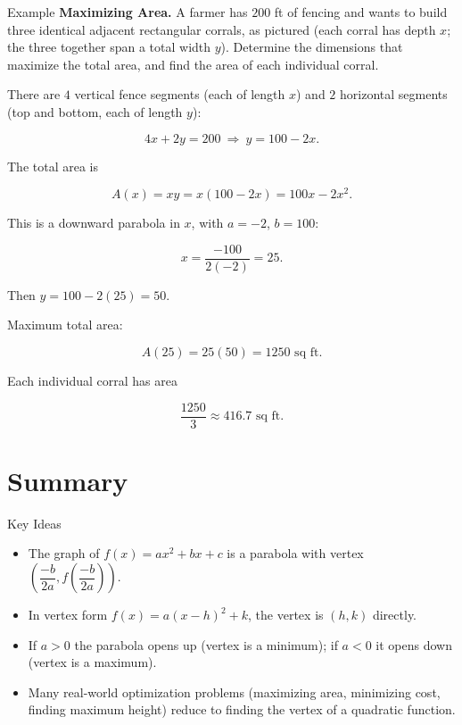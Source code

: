 \documentclass[12pt]{article}
\newcounter{examplenum}
\newenvironment{friendlyex}{%
    \refstepcounter{examplenum}%
    \begin{friendlyexbox}{Example \theexamplenum}%
}{%
    \end{friendlyexbox}%
}
\begin{document}
  

\begin{friendlyex}{}
\textbf{Maximizing Area.} A farmer has $200$ ft of fencing and wants to build three identical adjacent rectangular corrals, as pictured (each corral has depth $x$; the three together span a total width $y$). Determine the dimensions that maximize the total area, and find the area of each individual corral.
\end{friendlyex}

\begin{center}
\end{center}

 

\begin{solutionbox}
There are $4$ vertical fence segments (each of length $x$) and $2$ horizontal segments (top and bottom, each of length $y$):

\[
4x+2y=200\ \Longrightarrow\ y=100-2x.
\]

The total area is

\[
A(x)=xy=x(100-2x)=100x-2x^2.
\]

This is a downward parabola in $x$, with $a=-2$, $b=100$:

\[
x=\frac{-100}{2(-2)}=25.
\]

Then $y=100-2(25)=50$.

Maximum total area:

\[
A(25)=25(50)=1250\text{ sq ft.}
\]

Each individual corral has area

\[
\frac{1250}{3}\approx 416.7\text{ sq ft.}
\]
\end{solutionbox}

  

\section*{Summary}

\begin{friendlyrule}{Key Ideas}
\begin{itemize}
    \item The graph of $f(x)=ax^2+bx+c$ is a parabola with vertex $\left(\dfrac{-b}{2a}, f\left(\dfrac{-b}{2a}\right)\right)$.
    \item In vertex form $f(x)=a(x-h)^2+k$, the vertex is $(h,k)$ directly.
    \item If $a>0$ the parabola opens up (vertex is a minimum); if $a<0$ it opens down (vertex is a maximum).
    \item Many real-world optimization problems (maximizing area, minimizing cost, finding maximum height) reduce to finding the vertex of a quadratic function.
\end{itemize}
\end{friendlyrule}
\end{document}
